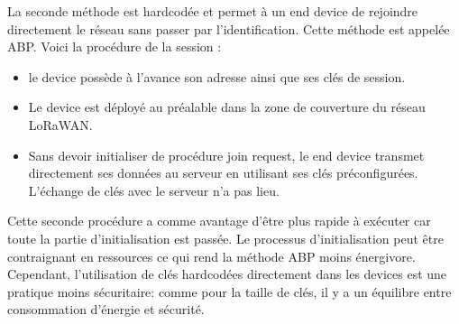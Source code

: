 \newpage
        
La seconde méthode est hardcodée et permet à un end device de rejoindre directement le réseau sans passer par l'identification. Cette méthode est appelée \ac{ABP}. Voici la procédure de la session :
\begin{itemize}
\item le device possède à l'avance son adresse ainsi que ses clés de session.
\item Le device est déployé au préalable dans la zone de couverture du réseau LoRaWAN.
\item Sans devoir initialiser de procédure join request, le end device transmet directement ses données au serveur en utilisant ses clés préconfigurées. L'échange de clés avec le serveur n'a pas lieu.
\end{itemize}

\vspace{0.1cm}

Cette seconde procédure a comme avantage d'être plus rapide à exécuter car toute la partie d'initialisation est passée. Le processus d'initialisation peut être contraignant en ressources ce qui rend la méthode \ac{ABP} moins énergivore. Cependant, l'utilisation de clés hardcodées directement dans les devices est une pratique moins sécuritaire: comme pour la taille de clés, il y a un équilibre entre consommation d'énergie et sécurité.
